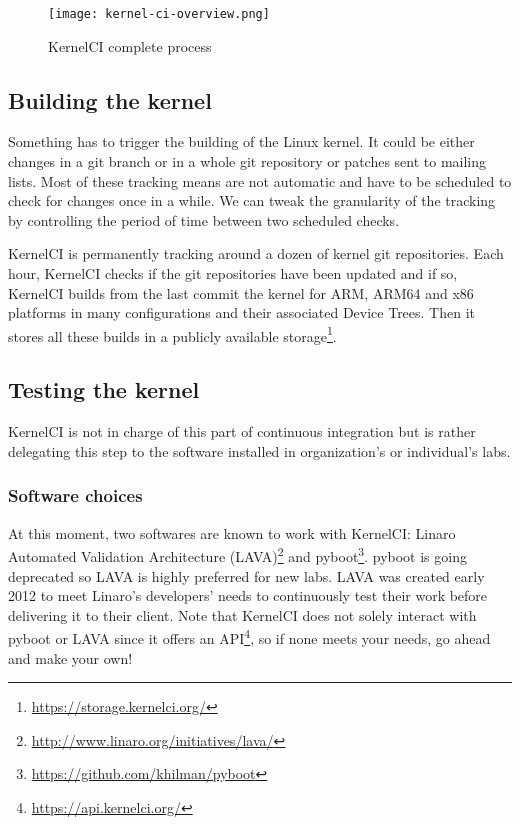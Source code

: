 \begin{figure}[H]
  \texttt{[image: kernel-ci-overview.png]}
  \caption{KernelCI complete process}
\end{figure}

\subsection{Building the kernel}

Something has to trigger the building of the Linux kernel. It could be either changes in a git branch or in a whole git repository or patches sent to mailing lists. Most of these tracking means are not automatic and have to be scheduled to check for changes once in a while. We can tweak the granularity of the tracking by controlling the period of time between two scheduled checks.

KernelCI is permanently tracking around a dozen of kernel git repositories. Each hour, KernelCI checks if the git repositories have been updated and if so, KernelCI builds from the last commit the kernel for ARM, ARM64 and x86 platforms in many configurations and their associated Device Trees. Then it stores all these builds in a publicly available storage\footnote{\url{https://storage.kernelci.org/}}.

\subsection{Testing the kernel}

KernelCI is not in charge of this part of continuous integration but is rather delegating this step to the software installed in organization's or individual's labs.

\subsubsection{Software choices}

At this moment, two softwares are known to work with KernelCI: Linaro Automated Validation Architecture (LAVA)\footnote{\url{http://www.linaro.org/initiatives/lava/}} and pyboot\footnote{\url{https://github.com/khilman/pyboot}}. pyboot is going deprecated so LAVA is highly preferred for new labs. LAVA was created early 2012 to meet Linaro's developers' needs to continuously test their work before delivering it to their client. Note that KernelCI does not solely interact with pyboot or LAVA since it offers an API\footnote{\url{https://api.kernelci.org/}}, so if none meets your needs, go ahead and make your own!

